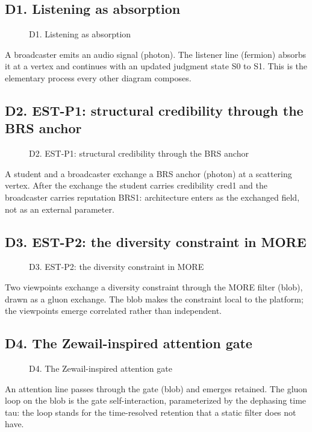 \documentclass[11pt,a4paper]{article}
\begin{document}
\subsection*{D1. Listening as absorption}
\begin{figure}[H]
\centering

\caption{D1. Listening as absorption}
\end{figure}
A broadcaster emits an audio signal (photon). The listener line (fermion) absorbs it at a vertex and continues with an updated judgment state S0 to S1. This is the elementary process every other diagram composes.

\subsection*{D2. EST-P1: structural credibility through the BRS anchor}
\begin{figure}[H]
\centering

\caption{D2. EST-P1: structural credibility through the BRS anchor}
\end{figure}
A student and a broadcaster exchange a BRS anchor (photon) at a scattering vertex. After the exchange the student carries credibility cred1 and the broadcaster carries reputation BRS1: architecture enters as the exchanged field, not as an external parameter.

\subsection*{D3. EST-P2: the diversity constraint in MORE}
\begin{figure}[H]
\centering

\caption{D3. EST-P2: the diversity constraint in MORE}
\end{figure}
Two viewpoints exchange a diversity constraint through the MORE filter (blob), drawn as a gluon exchange. The blob makes the constraint local to the platform; the viewpoints emerge correlated rather than independent.

\subsection*{D4. The Zewail-inspired attention gate}
\begin{figure}[H]
\centering

\caption{D4. The Zewail-inspired attention gate}
\end{figure}
An attention line passes through the gate (blob) and emerges retained. The gluon loop on the blob is the gate self-interaction, parameterized by the dephasing time tau: the loop stands for the time-resolved retention that a static filter does not have.
\end{document}
